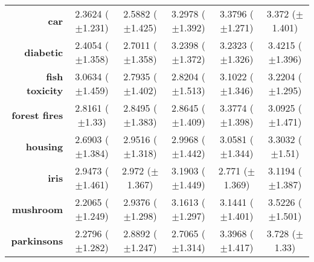 \begin{table}[htb]
{\begin{tabular}{r|ccccc}
			\textbf{car}                 & \cellcolor[rgb]{ .388,  .745,  .482}2.3624 ($\pm$1.231) & \cellcolor[rgb]{ .533,  .784,  .49}2.5882 ($\pm$1.425)  & \cellcolor[rgb]{ 1,  .922,  .518}3.2978 ($\pm$1.392)    & \cellcolor[rgb]{ .973,  .412,  .42}3.3796 ($\pm$1.271)  & \cellcolor[rgb]{ .976,  .459,  .431}3.372 ($\pm$1.401)  \\
			\textbf{diabetic}            & \cellcolor[rgb]{ .388,  .745,  .482}2.4054 ($\pm$1.358) & \cellcolor[rgb]{ .604,  .808,  .494}2.7011 ($\pm$1.358) & \cellcolor[rgb]{ 1,  .902,  .518}3.2398 ($\pm$1.372)    & \cellcolor[rgb]{ 1,  .922,  .518}3.2323 ($\pm$1.326)    & \cellcolor[rgb]{ .973,  .412,  .42}3.4215 ($\pm$1.396)  \\
			\textbf{fish toxicity}       & \cellcolor[rgb]{ 1,  .922,  .518}3.0634 ($\pm$1.459)    & \cellcolor[rgb]{ .388,  .745,  .482}2.7935 ($\pm$1.402) & \cellcolor[rgb]{ .447,  .761,  .482}2.8204 ($\pm$1.513) & \cellcolor[rgb]{ .996,  .796,  .494}3.1022 ($\pm$1.346) & \cellcolor[rgb]{ .973,  .412,  .42}3.2204 ($\pm$1.295)  \\
			\textbf{forest fires}        & \cellcolor[rgb]{ .388,  .745,  .482}2.8161 ($\pm$1.33)  & \cellcolor[rgb]{ .808,  .867,  .506}2.8495 ($\pm$1.383) & \cellcolor[rgb]{ 1,  .922,  .518}2.8645 ($\pm$1.409)    & \cellcolor[rgb]{ .973,  .412,  .42}3.3774 ($\pm$1.398)  & \cellcolor[rgb]{ .988,  .698,  .475}3.0925 ($\pm$1.471) \\
			\textbf{housing}             & \cellcolor[rgb]{ .388,  .745,  .482}2.6903 ($\pm$1.384) & \cellcolor[rgb]{ .91,  .894,  .51}2.9516 ($\pm$1.318)   & \cellcolor[rgb]{ 1,  .922,  .518}2.9968 ($\pm$1.442)    & \cellcolor[rgb]{ .996,  .82,  .498}3.0581 ($\pm$1.344)  & \cellcolor[rgb]{ .973,  .412,  .42}3.3032 ($\pm$1.51)   \\
			\textbf{iris}                & \cellcolor[rgb]{ .922,  .898,  .51}2.9473 ($\pm$1.461)  & \cellcolor[rgb]{ 1,  .922,  .518}2.972 ($\pm$1.367)     & \cellcolor[rgb]{ .973,  .412,  .42}3.1903 ($\pm$1.449)  & \cellcolor[rgb]{ .388,  .745,  .482}2.771 ($\pm$1.369)  & \cellcolor[rgb]{ .984,  .58,  .455}3.1194 ($\pm$1.387)  \\
			\textbf{mushroom}            & \cellcolor[rgb]{ .388,  .745,  .482}2.2065 ($\pm$1.249) & \cellcolor[rgb]{ .863,  .882,  .51}2.9376 ($\pm$1.298)  & \cellcolor[rgb]{ 1,  .902,  .514}3.1613 ($\pm$1.297)    & \cellcolor[rgb]{ 1,  .922,  .518}3.1441 ($\pm$1.401)    & \cellcolor[rgb]{ .973,  .412,  .42}3.5226 ($\pm$1.501)  \\
			\textbf{parkinsons}          & \cellcolor[rgb]{ .388,  .745,  .482}2.2796 ($\pm$1.282) & \cellcolor[rgb]{ 1,  .922,  .518}2.8892 ($\pm$1.247)    & \cellcolor[rgb]{ .816,  .867,  .506}2.7065 ($\pm$1.314) & \cellcolor[rgb]{ .984,  .616,  .459}3.3968 ($\pm$1.417) & \cellcolor[rgb]{ .973,  .412,  .42}3.728 ($\pm$1.33)    \\

\end{tabular}}
\end{table}
